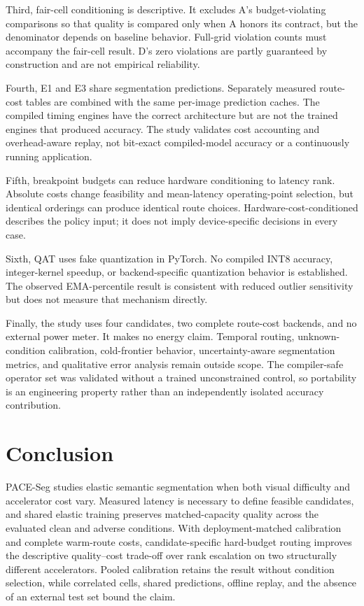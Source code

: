 \documentclass[a4paper,review,12pt]{elsarticle}
\newcommand{\method}{PACE-Seg}
\begin{document}
Third, fair-cell conditioning is descriptive. It excludes A's budget-violating comparisons so that quality is compared only when A honors its contract, but the denominator depends on baseline behavior. Full-grid violation counts must accompany the fair-cell result. D's zero violations are partly guaranteed by construction and are not empirical reliability.

Fourth, E1 and E3 share segmentation predictions. Separately measured route-cost tables are combined with the same per-image prediction caches. The compiled timing engines have the correct architecture but are not the trained engines that produced accuracy. The study validates cost accounting and overhead-aware replay, not bit-exact compiled-model accuracy or a continuously running application.

Fifth, breakpoint budgets can reduce hardware conditioning to latency rank. Absolute costs change feasibility and mean-latency operating-point selection, but identical orderings can produce identical route choices. Hardware-cost-conditioned describes the policy input; it does not imply device-specific decisions in every case.

Sixth, QAT uses fake quantization in PyTorch. No compiled INT8 accuracy, integer-kernel speedup, or backend-specific quantization behavior is established. The observed EMA-percentile result is consistent with reduced outlier sensitivity but does not measure that mechanism directly.

Finally, the study uses four candidates, two complete route-cost backends, and no external power meter. It makes no energy claim. Temporal routing, unknown-condition calibration, cold-frontier behavior, uncertainty-aware segmentation metrics, and qualitative error analysis remain outside scope. The compiler-safe operator set was validated without a trained unconstrained control, so portability is an engineering property rather than an independently isolated accuracy contribution.

\section{Conclusion}
\label{sec:conclusion}

\method{} studies elastic semantic segmentation when both visual difficulty and accelerator cost vary. Measured latency is necessary to define feasible candidates, and shared elastic training preserves matched-capacity quality across the evaluated clean and adverse conditions. With deployment-matched calibration and complete warm-route costs, candidate-specific hard-budget routing improves the descriptive quality--cost trade-off over rank escalation on two structurally different accelerators. Pooled calibration retains the result without condition selection, while correlated cells, shared predictions, offline replay, and the absence of an external test set bound the claim.
\end{document}

